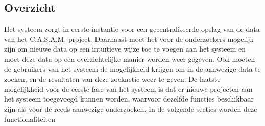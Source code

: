 \subsection{Overzicht}
\label{overzicht}

Het systeem zorgt in eerste instantie voor een gecentraliseerde opslag van de data van het C.A.S.A.M.-project.
Daarnaast moet het voor de onderzoekers mogelijk zijn om nieuwe data op een intu\"itieve wijze toe te voegen aan het systeem en moet deze data op een overzichtelijke manier worden weer gegeven.
Ook moeten de gebruikers van het systeem de mogelijkheid krijgen om in de aanwezige data te zoeken, en de resultaten van deze zoekactie weer te geven.
De laatste mogelijkheid voor de eerste fase van het systeem is dat er nieuwe projecten aan het systeem toegevoegd kunnen worden, waarvoor dezelfde functies beschikbaar zijn als voor de reeds aanwezige onderzoeken. In de volgende secties worden deze functionaliteiten 
